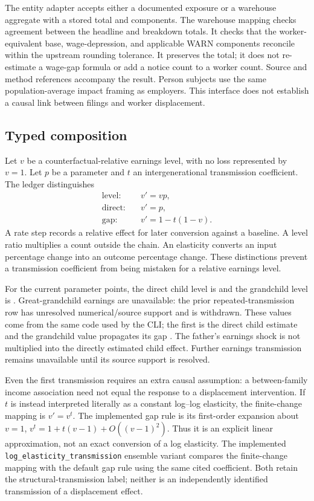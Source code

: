 \documentclass[10pt]{article}
\begin{document}
The entity adapter accepts either a documented exposure or a warehouse
aggregate with a stored total and components. The warehouse mapping checks
agreement between the headline and breakdown totals. It checks that the
worker-equivalent base, wage-depression, and applicable WARN components
reconcile within the upstream rounding tolerance. It preserves the total;
it does not re-estimate a wage-gap formula or add a notice count to a
worker count. Source and method references accompany the result. Person
subjects use the same population-average impact framing as employers.
This interface does not establish a causal link between filings and
worker displacement.

\subsection{Typed composition}
Let $v$ be a counterfactual-relative earnings level, with no loss represented
by $v=1$. Let $p$ be a parameter and $t$ an intergenerational transmission
coefficient. The ledger distinguishes
\begin{align}
 \text{level:}\quad &v'=vp,\\
 \text{direct:}\quad &v'=p,\\
 \text{gap:}\quad &v'=1-t(1-v).
\end{align}
A rate step records a relative effect for later conversion against a
baseline. A level ratio multiplies a count outside the chain. An
elasticity converts an input percentage change into an outcome percentage
change. These distinctions prevent a transmission coefficient from being
mistaken for a relative earnings level.

For the current parameter points, the direct child level is
\ChildPoint{} and the grandchild level is \GrandchildPoint{}.
Great-grandchild earnings are unavailable: the prior repeated-transmission
row has unresolved numerical/source support and is withdrawn.
These values come from the same code used by the CLI; the first is the
direct child estimate and the grandchild value propagates its gap
\cite{oreopoulos2008,solon1992,corak2013,chetty2014}.
The father's earnings shock is not multiplied into the directly estimated
child effect. Further earnings transmission remains unavailable until its source support is resolved.

Even the first transmission requires an extra causal assumption: a
between-family income association need not equal the response to a
displacement intervention. If $t$ is instead interpreted literally as
a constant log--log elasticity, the finite-change mapping is $v'=v^t$.
The implemented gap rule is its first-order expansion about $v=1$,
$v^t=1+t(v-1)+O((v-1)^2)$. Thus it is an explicit linear approximation,
not an exact conversion of a log elasticity. The implemented
\texttt{log\_elasticity\_transmission} ensemble variant compares the
finite-change mapping with the default gap rule using the same cited
coefficient. Both retain the structural-transmission label; neither is an
independently identified transmission of a displacement effect.
\end{document}

